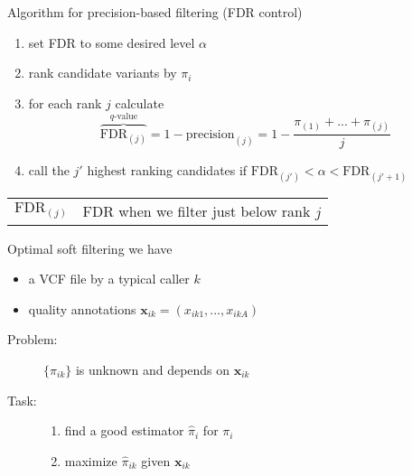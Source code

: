 \documentclass{beamer} %
\begin{document}
\begin{frame}{Algorithm for precision-based filtering (FDR control)}

\begin{enumerate}
\item set FDR to some desired level \(\alpha\)
\item rank candidate variants by \(\pi_i\) 
\item for each rank \(j\) calculate
\begin{equation*}
\overbrace{\text{FDR}_{(j)}}^{q\text{-value}} = 1 - \text{precision}_{(j)} = 1 -
\frac{\pi_{(1)} + ... + \pi_{(j)}}{j}
\end{equation*}
\item call the \(j'\) highest ranking candidates if \(\text{FDR}_{(j')} <
\alpha < \text{FDR}_{(j'+1)}\)

\end{enumerate}

\bigskip
{\footnotesize
\begin{tabular}{cl}
\hline
\(\text{FDR}_{(j)}\) & FDR when we filter just below rank \(j\) \\
\end{tabular}
}
\end{frame}


\begin{frame}{Optimal soft filtering}
we have
\begin{itemize}
\item a VCF file by a typical caller \(k\)
\item quality annotations \(\mathbf{x}_{ik} = (x_{ik1},...,x_{ikA})\)
\end{itemize}
\bigskip
\begin{description}
\item[Problem:] \(\{\pi_{ik}\}\) is unknown and depends on \(\mathbf{x}_{ik}\)
\item[Task:]
\begin{enumerate}
\item find a good estimator \(\hat{\pi}_{i}\) for \(\pi_{i}\) \\
\item maximize \(\hat{\pi}_{ik}\) given \(\mathbf{x}_{ik}\)
\end{enumerate}

\end{description}
\end{frame}
\end{document}
